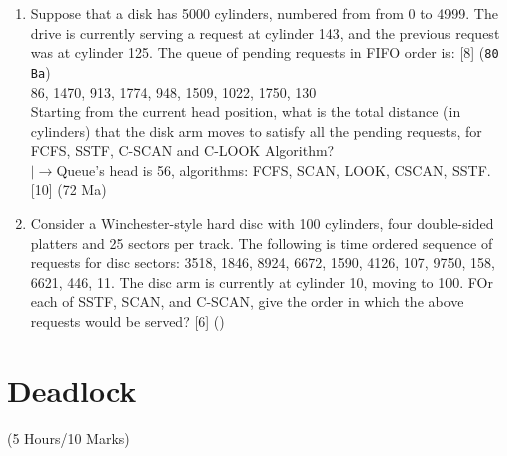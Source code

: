 \documentclass[12pt]{article}
\newcommand{\lb}{\\$\left|\rightarrow\right.$}
\begin{document}
\begin{enumerate}
			\item Suppose that a disk has 5000 cylinders, numbered from from 0 to 4999. The drive is currently serving a request at cylinder 143, and the previous request was at cylinder 125. The queue of pending requests in FIFO order is: \hfill [8] (\texttt{80 Ba})\\
			86, 1470, 913, 1774, 948, 1509, 1022, 1750, 130\\
			Starting from the current head position, what is the total distance (in cylinders) that the disk arm moves to satisfy all the pending requests, for FCFS, SSTF, C-SCAN and C-LOOK Algorithm?
			\lb Queue's head is 56, algorithms: FCFS, SCAN, LOOK, CSCAN, SSTF. \hfill [10] (72 Ma)

			\item Consider a Winchester-style hard disc with 100 cylinders, four double-sided platters and 25 sectors per track. The following is time ordered sequence of requests for disc sectors: {3518, 1846, 8924, 6672, 1590, 4126, 107, 9750, 158, 6621, 446, 11}. The disc arm is currently at cylinder 10, moving to 100. FOr each of SSTF, SCAN, and C-SCAN, give the order in which the above requests would be served? \hfill [6] ()
		\end{enumerate}

\pagebreak
\section{Deadlock}
	\begin{center}(5 Hours/10 Marks)\end{center}
\end{document}

